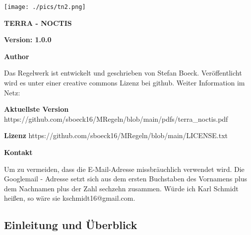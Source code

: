 \documentclass{article}
\begin{document}
\begin{titlepage}
\centering
\texttt{[image: ./pics/tn2.png]}
\vspace{2cm}
\newline\hline
\vspace{1cm}
{\Huge\textbf{TERRA - NOCTIS}\par}
\vspace{1cm}
\newline\hline
\vfill
\end{titlepage}
\sloppy

\textbf{Version: 1.0.0}

\vspace{1cm}
\newline\hline
\vspace{1cm}

\textbf{Author}

\newline

Das Regelwerk ist entwickelt und geschrieben von Stefan Boeck. Veröffentlicht wird es unter einer creative commons Lizenz
bei github. Weiter Information im Netz:

\newline
\vspace{1cm}
\textbf{Aktuellste Version} https://github.com/sboeck16/MRegeln/blob/main/pdfs/terra\_noctis.pdf

\newline
\vspace{5mm}
\textbf{Lizenz} https://github.com/sboeck16/MRegeln/blob/main/LICENSE.txt

\vspace{5mm}
\newline\hline
\vspace{1cm}

\textbf{Kontakt}

\newline

Um zu vermeiden, dass die E-Mail-Adresse missbräuchlich verwendet wird. Die Googlemail - Adresse setzt sich aus dem
ersten Buchstaben des Vornamens plus dem Nachnamen plus der Zahl sechzehn zusammen. Würde ich Karl Schmidt heißen,
so wäre sie kschmidt16@gmail.com.

\newpage\tableofcontents
\newpage
\begin{center}
\section{Einleitung und Überblick}
\end{center}
\end{document}
